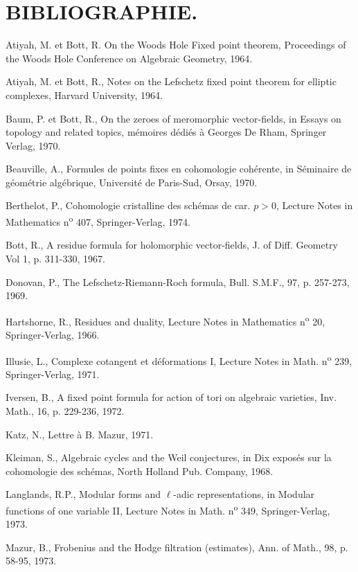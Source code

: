 \documentclass[11pt]{article}
\begin{document}
\section*{BIBLIOGRAPHIE.}
\begin{enumerate}[label={[\arabic*]},leftmargin=3.5em]
\item
Atiyah, M. et Bott, R. On the Woods Hole Fixed point theorem, Proceedings of the Woods Hole Conference on Algebraic Geometry, 1964.
\item Atiyah, M. et Bott, R., Notes on the Lefschetz fixed point theorem for elliptic complexes, Harvard University, 1964.
\item Baum, P. et Bott, R., On the zeroes of meromorphic vector-fields, in Essays on topology and related topics, mémoires dédiés à Georges De Rham, Springer Verlag, 1970.
\item Beauville, A., Formules de points fixes en cohomologie cohérente, in Séminaire de géométrie algébrique, Université de Paris-Sud, Orsay, 1970.
\item Berthelot, P., Cohomologie cristalline des schémas de car. $p>0$, Lecture Notes in Mathematics n\textsuperscript{o} 407, Springer-Verlag, 1974.
\item Bott, R., A residue formula for holomorphic vector-fields, J. of Diff. Geometry Vol 1, p. 311-330, 1967.
\item Donovan, P., The Lefschetz-Riemann-Roch formula, Bull. S.M.F., 97, p. 257-273, 1969.
\item Hartshorne, R., Residues and duality, Lecture Notes in Mathematics n\textsuperscript{o} 20, Springer-Verlag, 1966.
\item Illusie, L., Complexe cotangent et déformations I, Lecture Notes in Math. n\textsuperscript{o} 239, Springer-Verlag, 1971.
\item Iversen, B., A fixed point formula for action of tori on algebraic varieties, Inv. Math., 16, p. 229-236, 1972.
\item Katz, N., Lettre à B. Mazur, 1971.
\item
Kleiman, S., Algebraic cycles and the Weil conjectures, in Dix exposés sur la cohomologie des schémas, North Holland Pub. Company, 1968.
\item Langlands, R.P., Modular forms and $\ell$-adic representations, in Modular functions of one variable II, Lecture Notes in Math. n\textsuperscript{o} 349, Springer-Verlag, 1973.
\item Mazur, B., Frobenius and the Hodge filtration (estimates), Ann. of Math., 98, p. 58-95, 1973.

\end{enumerate}
\end{document}
